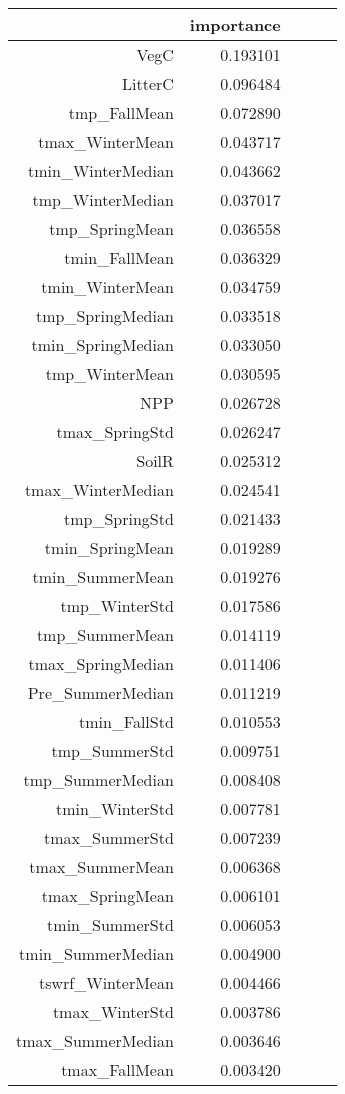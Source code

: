 \begin{tabular}{rrrrr}
\toprule
 & importance \\
\midrule
VegC & 0.193101 \\
LitterC & 0.096484 \\
tmp_FallMean & 0.072890 \\
tmax_WinterMean & 0.043717 \\
tmin_WinterMedian & 0.043662 \\
tmp_WinterMedian & 0.037017 \\
tmp_SpringMean & 0.036558 \\
tmin_FallMean & 0.036329 \\
tmin_WinterMean & 0.034759 \\
tmp_SpringMedian & 0.033518 \\
tmin_SpringMedian & 0.033050 \\
tmp_WinterMean & 0.030595 \\
NPP & 0.026728 \\
tmax_SpringStd & 0.026247 \\
SoilR & 0.025312 \\
tmax_WinterMedian & 0.024541 \\
tmp_SpringStd & 0.021433 \\
tmin_SpringMean & 0.019289 \\
tmin_SummerMean & 0.019276 \\
tmp_WinterStd & 0.017586 \\
tmp_SummerMean & 0.014119 \\
tmax_SpringMedian & 0.011406 \\
Pre_SummerMedian & 0.011219 \\
tmin_FallStd & 0.010553 \\
tmp_SummerStd & 0.009751 \\
tmp_SummerMedian & 0.008408 \\
tmin_WinterStd & 0.007781 \\
tmax_SummerStd & 0.007239 \\
tmax_SummerMean & 0.006368 \\
tmax_SpringMean & 0.006101 \\
tmin_SummerStd & 0.006053 \\
tmin_SummerMedian & 0.004900 \\
tswrf_WinterMean & 0.004466 \\
tmax_WinterStd & 0.003786 \\
tmax_SummerMedian & 0.003646 \\
tmax_FallMean & 0.003420 \\

\end{tabular}
